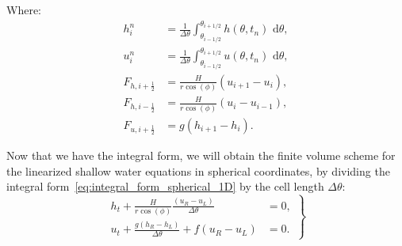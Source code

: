 Where:
\begin{equation}
    \begin{aligned}
        h_i^n &= \frac{1}{\Delta \theta} \int_{\theta_{i-1/2}}^{\theta_{i+1/2}} h(\theta, t_n) \text{ d}\theta, \\
        u_i^n &= \frac{1}{\Delta \theta} \int_{\theta_{i-1/2}}^{\theta_{i+1/2}} u(\theta, t_n) \text{ d}\theta, \\
        F_{h, i + \frac{1}{2}} &= \frac{H}{r \cos(\phi)} (u_{i+1} - u_i), \\
        F_{h, i - \frac{1}{2}} &= \frac{H}{r \cos(\phi)} (u_{i} - u_{i-1}), \\
        F_{u, i + \frac{1}{2}} &= g(h_{i+1} - h_i).
    \end{aligned}
\end{equation}


Now that we have the integral form, we will obtain the finite volume scheme for the linearized shallow water equations in spherical coordinates, by dividing the integral form~\eqref{eq:integral_form_spherical_1D} by the cell length $\Delta \theta$:
\begin{equation}
    \left.
    \begin{aligned}
        h_t + \frac{H}{r \cos(\phi)} \frac{(u_R - u_L)}{\Delta \theta} &= 0, \\
        u_t +  \frac{g (h_R - h_L)}{\Delta \theta} + f(u_R - u_L) &= 0.
    \end{aligned}
    \right\}
\end{equation}



